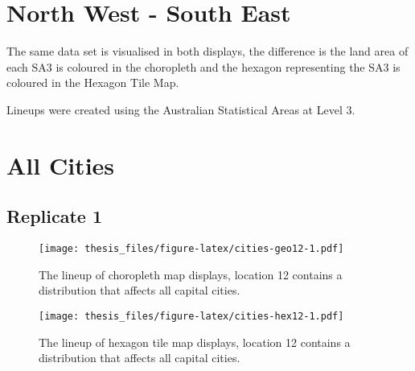 \documentclass{monashthesis}
\begin{document}
\hypertarget{north-west---south-east}{%
\section{North West - South East}\label{north-west---south-east}}

The same data set is visualised in both displays, the difference is the land area of each SA3 is coloured in the choropleth and the hexagon representing the SA3 is coloured in the Hexagon Tile Map.

Lineups were created using the Australian Statistical Areas at Level 3.

\hypertarget{all-cities}{%
\section{All Cities}\label{all-cities}}

\hypertarget{replicate-1}{%
\subsection{Replicate 1}\label{replicate-1}}

\begin{Shaded}
\begin{Highlighting}[]
\NormalTok{() }\OperatorTok{+}
\StringTok{  }\NormalTok{(}\NormalTok{(}\NormalTok{(}\NormalTok{)))}
\end{Highlighting}
\end{Shaded}

\begin{figure}
\centering
\texttt{[image: thesis\_files/figure-latex/cities-geo12-1.pdf]}
\caption{\label{fig:cities-geo12}The lineup of choropleth map displays, location 12 contains a distribution that affects all capital cities.}
\end{figure}

\begin{Shaded}
\begin{Highlighting}[]
\NormalTok{() }\OperatorTok{+}
\StringTok{  }\NormalTok{(}\NormalTok{(}\NormalTok{(}\NormalTok{)))}
\end{Highlighting}
\end{Shaded}

\begin{figure}
\centering
\texttt{[image: thesis\_files/figure-latex/cities-hex12-1.pdf]}
\caption{\label{fig:cities-hex12}The lineup of hexagon tile map displays, location 12 contains a distribution that affects all capital cities.}
\end{figure}
\end{document}
